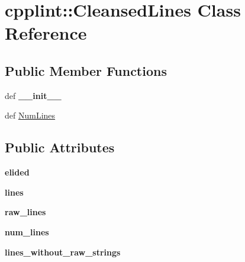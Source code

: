 \hypertarget{classcpplint_1_1CleansedLines}{
\section{cpplint::CleansedLines Class Reference}
\label{classcpplint_1_1CleansedLines}
}
\subsection*{Public Member Functions}
\begin{DoxyCompactItemize}
\item 
\hypertarget{classcpplint_1_1CleansedLines_a59073eeb9d3a72c298ac1b69b1cb08d3}{
def {\bfseries \_\-\_\-init\_\-\_\-}}
\label{classcpplint_1_1CleansedLines_a59073eeb9d3a72c298ac1b69b1cb08d3}

\item 
def \hyperlink{classcpplint_1_1CleansedLines_acea181117087398a3d8d6ba21f903cc1}{NumLines}
\end{DoxyCompactItemize}
\subsection*{Public Attributes}
\begin{DoxyCompactItemize}
\item 
\hypertarget{classcpplint_1_1CleansedLines_a2d2ee50c3c89e3660820774374920771}{
{\bfseries elided}}
\label{classcpplint_1_1CleansedLines_a2d2ee50c3c89e3660820774374920771}

\item 
\hypertarget{classcpplint_1_1CleansedLines_aee168e50da4b96068b07394acd33159f}{
{\bfseries lines}}
\label{classcpplint_1_1CleansedLines_aee168e50da4b96068b07394acd33159f}

\item 
\hypertarget{classcpplint_1_1CleansedLines_a6b25376332663840faf647680abf1da5}{
{\bfseries raw\_\-lines}}
\label{classcpplint_1_1CleansedLines_a6b25376332663840faf647680abf1da5}

\item 
\hypertarget{classcpplint_1_1CleansedLines_a5920c7671c6cac4f728a8f83b5a8c954}{
{\bfseries num\_\-lines}}
\label{classcpplint_1_1CleansedLines_a5920c7671c6cac4f728a8f83b5a8c954}

\item 
\hypertarget{classcpplint_1_1CleansedLines_a1e3bce3076f87f0437b2c1e611f97cdf}{
{\bfseries lines\_\-without\_\-raw\_\-strings}}
\label{classcpplint_1_1CleansedLines_a1e3bce3076f87f0437b2c1e611f97cdf}

\end{DoxyCompactItemize}


